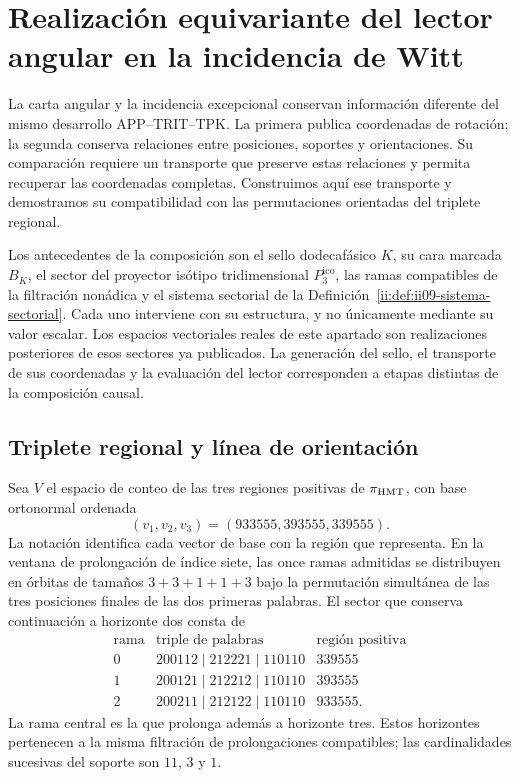 \section{Realización equivariante del lector angular en la incidencia de Witt}
\label{ii:sec:ii-enlace-angular-witt}

La carta angular y la incidencia excepcional conservan información diferente
del mismo desarrollo APP--TRIT--TPK. La primera publica coordenadas de
rotación; la segunda conserva relaciones entre posiciones, soportes y
orientaciones. Su comparación requiere un transporte que preserve estas
relaciones y permita recuperar las coordenadas completas. Construimos aquí
ese transporte y demostramos su compatibilidad con las permutaciones
orientadas del triplete regional.

Los antecedentes de la composición son el sello dodecafásico \(K\), su
cara marcada \(B_K\), el sector del proyector isótipo tridimensional
\(P_3^{\mathrm{ico}}\), las ramas
compatibles de la filtración nonádica y el sistema sectorial de la
Definición~\ref{ii:def:ii09-sistema-sectorial}. Cada uno interviene con su
estructura, y no únicamente mediante su valor escalar. Los espacios
vectoriales reales de este apartado son realizaciones posteriores de esos
sectores ya publicados. La generación del sello, el transporte de sus
coordenadas y la evaluación del lector corresponden a etapas distintas de
la composición causal.

\subsection{Triplete regional y línea de orientación}

Sea \(V\) el espacio de conteo de las tres regiones positivas de
\(\pi_{\rm HMT}\), con base ortonormal ordenada
\[
 (v_1,v_2,v_3)=(933555,393555,339555).
\]
La notación identifica cada vector de base con la región que representa.
En la ventana de prolongación de índice siete, las once ramas admitidas
se distribuyen en órbitas de tamaños \(3+3+1+1+3\) bajo la permutación
simultánea de las tres posiciones finales de las dos primeras palabras.
El sector que conserva continuación a horizonte dos consta de
\[
\begin{array}{c|c|c}
\text{rama}&\text{triple de palabras}&\text{región positiva}\\ \hline
0&200112\mid212221\mid110110&339555\\
1&200121\mid212212\mid110110&393555\\
2&200211\mid212122\mid110110&933555.
\end{array}
\]
La rama central es la que prolonga además a horizonte tres. Estos
horizontes pertenecen a la misma filtración de prolongaciones compatibles;
las cardinalidades sucesivas del soporte son \(11\), \(3\) y \(1\).

